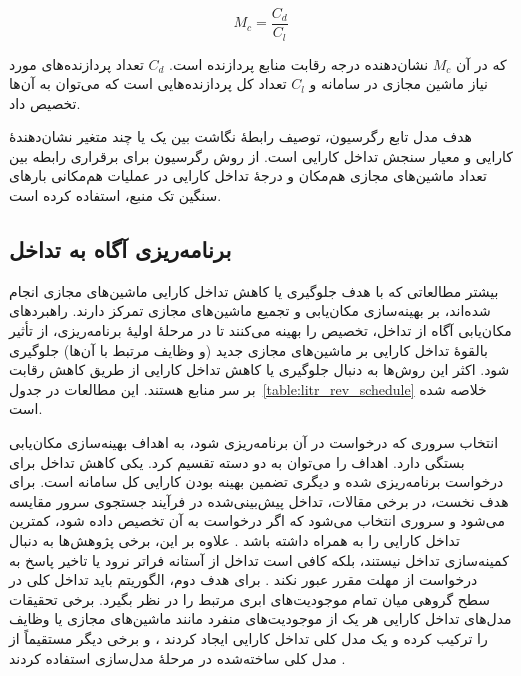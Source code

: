 \begin{equation} \label{eq:rel_res_contention}
    M_c = \frac{C_d}{C_l}
\end{equation}

که در آن $M_c$ نشان‌دهنده درجه رقابت منابع پردازنده است. $C_d$ تعداد پردازنده‌های مورد نیاز ماشین مجازی در سامانه و $C_l$ تعداد کل پردازنده‌هایی است که می‌توان به آن‌ها تخصیص داد.

هدف مدل تابع رگرسیون، توصیف رابطهٔ نگاشت بین یک یا چند متغیر نشان‌دهندهٔ کارایی و معیار سنجش تداخل کارایی است. \cite{jersak2016performance} از روش رگرسیون برای برقراری رابطه بین تعداد ماشین‌های مجازی هم‌مکان و درجهٔ تداخل کارایی در عملیات هم‌مکانی بارهای سنگین تک منبع، استفاده کرده است.

\subsection{برنامه‌ریزی آگاه به تداخل}

بیشتر مطالعاتی که با هدف جلوگیری یا کاهش تداخل کارایی ماشین‌های مجازی انجام شده‌اند، بر بهینه‌سازی مکان‌یابی و تجمیع ماشین‌های مجازی تمرکز دارند. راهبردهای مکان‌یابی آگاه از تداخل، تخصیص را بهینه می‌کنند تا در مرحلهٔ اولیهٔ برنامه‌ریزی، از تأثیر بالقوهٔ تداخل کارایی بر ماشین‌های مجازی جدید (و وظایف مرتبط با آن‌ها) جلوگیری شود. اکثر این روش‌ها به دنبال جلوگیری یا کاهش تداخل کارایی از طریق کاهش رقابت بر سر منابع هستند. این مطالعات در جدول~\ref{table:litr_rev_schedule} خلاصه شده‌ است.

انتخاب سروری که درخواست در آن برنامه‌ریزی شود، به اهداف بهینه‌سازی مکان‌یابی بستگی دارد. اهداف را می‌توان به دو دسته تقسیم کرد. یکی کاهش تداخل برای درخواست برنامه‌ریزی شده و دیگری تضمین بهینه بودن کارایی کل سامانه است. برای هدف نخست، در برخی مقالات، تداخل پیش‌بینی‌شده در فرآیند جستجوی سرور مقایسه می‌شود و سروری انتخاب می‌شود که اگر درخواست به آن تخصیص داده شود، کمترین تداخل کارایی را به همراه داشته باشد \cite{zhang2015minimizing,romero2018mage}. علاوه بر این، برخی پژوهش‌ها به دنبال کمینه‌سازی تداخل نیستند، بلکه کافی است تداخل از آستانه فراتر نرود \cite{Bu2013ILA, jersak2016performance, angelou2016improving} یا تاخیر پاسخ به درخواست از مهلت مقرر عبور نکند \cite{Chen2017Prophet}. برای هدف دوم، الگوریتم باید تداخل کلی در سطح گروهی میان تمام موجودیت‌های ابری مرتبط را در نظر بگیرد. برخی تحقیقات مدل‌های تداخل کارایی هر یک از موجودیت‌های منفرد مانند ماشین‌های مجازی یا وظایف را ترکیب کرده و یک مدل کلی تداخل کارایی ایجاد کردند \cite{meloalves2018interference, hamdi2019managing, lin2012interference}، و برخی دیگر مستقیماً از مدل کلی ساخته‌شده در مرحلهٔ مدل‌سازی استفاده کردند \cite{Shaw2019Energy}.

